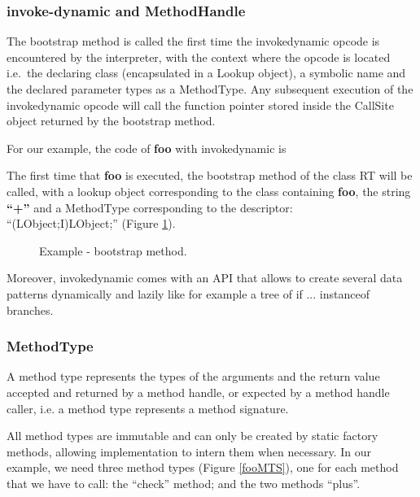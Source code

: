 \documentclass{sig-alternate}
\begin{document}
    \subsubsection{invoke-dynamic and MethodHandle}

      The bootstrap method is called the first time the invokedynamic opcode is encountered by the interpreter,
      with the context where the opcode is located i.e.~the declaring class (encapsulated in a Lookup object),
      a symbolic name and the declared parameter types as a MethodType.
      Any subsequent execution of the invokedynamic opcode will call the function pointer
      stored inside the CallSite object returned by the bootstrap method.
      
      For our example, the code of {\bf foo} with invokedynamic is

      

      The first time that {\bf foo} is executed, the bootstrap method of the class RT will be called, with a lookup object corresponding to the class containing {\bf foo},
      the string {\bf ``+''} and a MethodType corresponding to the descriptor:\\``(LObject;I)LObject;'' (Figure \ref{fooBSM}).

      \begin{figure}[!h]
        \centering \vspace{-1.5em}
        \caption{Example - bootstrap method.}
        \label{fooBSM}
      \end{figure}

      Moreover, invokedynamic comes with an API that allows to create several data patterns
      dynamically and lazily like for example a tree of if ... instanceof branches.

    \subsubsection{MethodType}

      A method type represents the types of the arguments and the return value accepted and returned by a method handle,
      or expected by a method handle caller, i.e. a method type represents a method signature.

      All method types are immutable and can only be created by static factory methods,
      allowing implementation to intern them when necessary. 
      In our example, we need three method types (Figure \ref{fooMTS}), one for each method that we have to call:
      the ``check'' method; and the two methods ``plus''.
\end{document}
